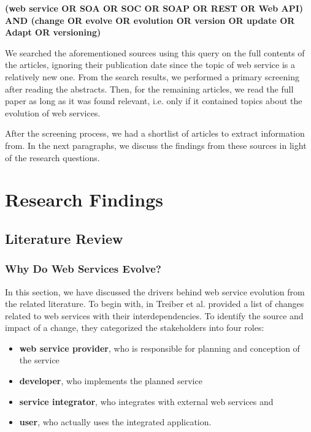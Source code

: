 \documentclass[runningheads,a4paper]{llncs}
\begin{document}
\textbf{(web service OR SOA OR SOC OR SOAP OR REST OR Web API)  AND (change OR evolve OR evolution OR version OR update OR Adapt OR versioning)}

We searched the aforementioned sources using this query on the full contents of the articles, ignoring their publication date since the topic of web service is a relatively new one. From the search results, we performed a primary screening after reading the abstracts. Then, for the remaining articles, we read the full paper as long as it was found relevant, i.e. only if it contained topics about the evolution of web services.

After the screening process, we had a shortlist of articles to extract information from. In the next paragraphs, we discuss the findings from these sources in light of the research questions.


\section{Research Findings} %
\label{sec:research_findings}

\subsection{Literature Review} %
\label{sub:literature_review}

\subsubsection{Why Do Web Services Evolve?} %
\label{sub:why_do_web_services_change}
In this section, we have discussed the drivers behind web service evolution from the related literature. To begin with, in \cite{treiber2009analyzing} Treiber et al. provided a list of changes related to web services with their interdependencies. To identify the source and impact of a change, they categorized the stakeholders into four roles:

\begin{itemize}
  \item \textbf{web service provider}, who is responsible for planning and conception of the service
  \item \textbf{developer}, who implements the planned service
  \item \textbf{service integrator}, who integrates with external web services and
  \item \textbf{user}, who actually uses the integrated application.
\end{itemize}
\end{document}

